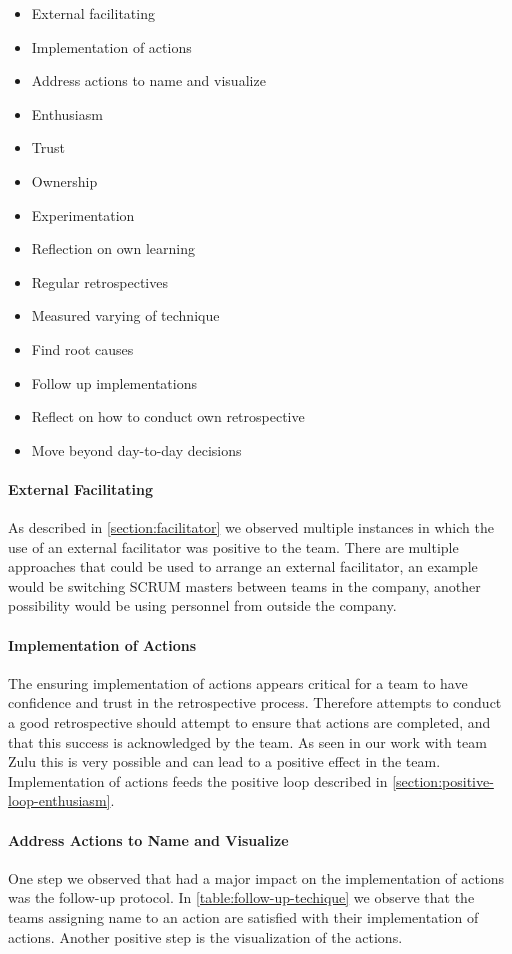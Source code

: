 \begin{itemize}
	\setlength\itemsep{1pt}
	\item External facilitating
	\item Implementation of actions 
	\item Address actions to name and visualize
	\item Enthusiasm
	\item Trust
	\item Ownership
	\item Experimentation
	\item Reflection on own learning
	\item Regular retrospectives
	\item Measured varying of technique
	\item Find root causes
	\item Follow up implementations
	\item Reflect on how to conduct own retrospective
	\item Move beyond day-to-day decisions
\end{itemize}

\paragraph{External Facilitating}
As described in \autoref{section:facilitator} we observed multiple instances in which the use of an external facilitator was positive to the team. There are multiple approaches that could be used to arrange an external facilitator, an example would be switching SCRUM masters between teams in the company, another possibility would be using personnel from outside the company.

\paragraph{Implementation of Actions}
The ensuring implementation of actions appears critical for a team to have confidence and trust in the retrospective process. Therefore attempts to conduct a good retrospective should attempt to ensure that actions are completed, and that this success is acknowledged by the team. As seen in our work with team Zulu this is very possible and can lead to a positive effect in the team. Implementation of actions feeds the positive loop described in \autoref{section:positive-loop-enthusiasm}.

\paragraph{Address Actions to Name and Visualize}
One step we observed that had a major impact on the implementation of actions was the follow-up protocol. In \autoref{table:follow-up-techique} we observe that the teams assigning name to an action are satisfied with their implementation of actions. Another positive step is the visualization of the actions.

